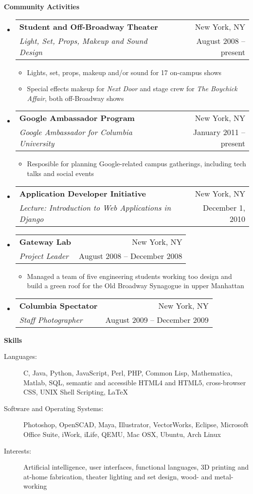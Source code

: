 \documentclass[letterpaper,11pt]{article}
\makeatletter
\newcommand{\resitem}[1]{\item #1 \vspace{-2pt}}
\newcommand{\resheading}[1]{{\vspace{16pt}\large
    \colorbox{heading_color}{\begin{minipage}{\textwidth}{\textbf{ #1
            \vphantom{p\^{E}}}}\end{minipage}}}}
\newcommand{\ressubheading}[5]{
\item\begin{tabular*}{6.4in}{l@{\extracolsep{\fill}}r}
    \textbf{#1} & #2 \\
    \textit{#3} & #4 \\
  \end{tabular*}\vspace{-6pt}
  {\footnotesize \begin{itemize} #5 \end{itemize}}\vspace{6pt}}
\newcommand{\ressubheadingnoitems}[4]{
\item\begin{tabular*}{6.4in}{l@{\extracolsep{\fill}}r}
    \textbf{#1} & #2 \\
    \textit{#3} & #4 \\
  \end{tabular*}\vspace{6pt}}
\makeatother
\begin{document}
\resheading{Community Activities}
\begin{itemize}
  \ressubheading{Student and Off-Broadway Theater}{New York,
    NY}{Light, Set, Props, Makeup and Sound Design}{August 2008 -- present}{
      \resitem{Lights, set, props, makeup and/or sound for 17 on-campus shows}

      \resitem{Special effects makeup for \emph{Next Door} and stage
        crew for \emph{The Boychick Affair}, both off-Broadway shows}}

    \ressubheading{Google Ambassador Program}{New York, NY}{Google
      Ambassador for Columbia University}{January 2011 -- present}{
      
      \resitem{Resposible for planning Google-related campus
        gatherings, including tech talks and social events}}

    \ressubheadingnoitems{Application Developer Initiative}{New York,
      NY}{Lecture: Introduction to Web Applications in
      Django}{December 1, 2010}

    \ressubheading{Gateway Lab}{New York, NY}{Project Leader}{August
      2008 -- December 2008}{

      \resitem{Managed a team of five engineering students working too
        design and build a green roof for the Old Broadway Synagogue
        in upper Manhattan}}

  \ressubheadingnoitems{Columbia Spectator}{New York, NY}{Staff
    Photographer}{August 2009 -- December 2009}
\end{itemize} %

\resheading{Skills}
\begin{description}
\item[\textsf{Languages:}] C, Java, Python, JavaScript, Perl, PHP,
  Common Lisp, Mathematica, Matlab, SQL, semantic and accessible HTML4
  and HTML5, cross-browser CSS, UNIX Shell Scripting, \LaTeX

\item[\textsf{Software and Operating Systems:}] Photoshop, OpenSCAD,
  Maya, Illustrator, VectorWorks, Eclipse, Microsoft Office Suite,
  iWork, iLife, QEMU, Mac OSX, Ubuntu, Arch Linux

\item[\textsf{Interests:}] Artificial intelligence, user interfaces,
  functional languages, 3D printing and at-home fabrication, theater
  lighting and set design, wood- and metal-working
\end{description} %
\end{document}
